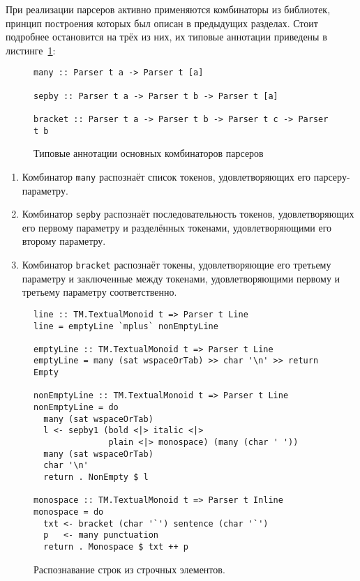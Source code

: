 При реализации парсеров активно применяются комбинаторы из библиотек, принцип
построения которых был описан в предыдущих разделах. Стоит подробнее остановится
на трёх из них, их типовые аннотации приведены в 
листинге~\ref{listing:ParserCombinators}:

\begin{figure}[h]
\begin{lstlisting}
many :: Parser t a -> Parser t [a]

sepby :: Parser t a -> Parser t b -> Parser t [a]

bracket :: Parser t a -> Parser t b -> Parser t c -> Parser t b
\end{lstlisting}
\caption{Типовые аннотации основных комбинаторов парсеров}
\label{listing:ParserCombinators}
\end{figure}

\begin{enumerate}
  \item Комбинатор \lstinline{many} распознаёт список токенов, удовлетворяющих
  его парсеру-параметру.
  \item Комбинатор \lstinline{sepby} распознаёт последовательность токенов,
  удовлетворяющих его первому параметру и разделённых токенами, удовлетворяющими 
  его второму параметру.
  \item Комбинатор \lstinline{bracket} распознаёт токены, удовлетворяющие его
  третьему параметру и заключенные между токенами, удовлетворяющими первому и
  третьему параметру соответственно.
\end{enumerate}

\begin{figure}[t]
\begin{lstlisting}
line :: TM.TextualMonoid t => Parser t Line
line = emptyLine `mplus` nonEmptyLine

emptyLine :: TM.TextualMonoid t => Parser t Line
emptyLine = many (sat wspaceOrTab) >> char '\n' >> return Empty

nonEmptyLine :: TM.TextualMonoid t => Parser t Line
nonEmptyLine = do
  many (sat wspaceOrTab)
  l <- sepby1 (bold <|> italic <|> 
               plain <|> monospace) (many (char ' '))
  many (sat wspaceOrTab)
  char '\n'
  return . NonEmpty $ l

monospace :: TM.TextualMonoid t => Parser t Inline
monospace = do
  txt <- bracket (char '`') sentence (char '`')
  p   <- many punctuation
  return . Monospace $ txt ++ p
\end{lstlisting}
\caption{Распознавание строк из строчных элементов.}
\label{listing:MarkdownInline}
\end{figure}

